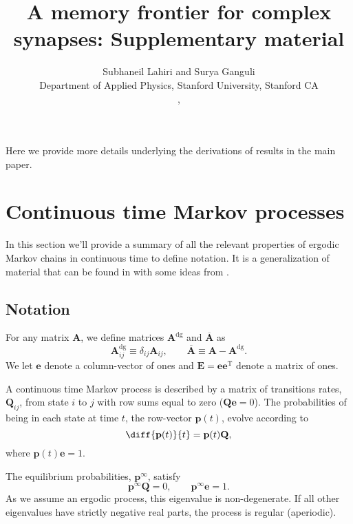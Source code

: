 \documentclass{article} %
\title{A memory frontier for complex synapses: Supplementary material}
\author{Subhaneil Lahiri and Surya Ganguli\\
Department of Applied Physics, Stanford University, Stanford CA\\
\emaillink{sulahiri@stanford.edu}, \emaillink{sulahiri@stanford.edu}
%
}
\newcommand{\dg}{^\mathrm{dg}}
\newcommand{\trans}{^\mathrm{T}}
\newcommand{\onev}{\mathbf{e}}
\newcommand{\onem}{\mathbf{E}}
\newcommand{\MM}{\mathbf{Q}}
\newcommand{\pr}{\mathbf{p}}
\newcommand{\eq}{\pr^\infty}
\begin{document}
\maketitle



Here we provide more details underlying the derivations of results in the main paper.

\section{Continuous time Markov processes}\label{sec:ContMarkov}

In this section we'll provide a summary of all the relevant properties of ergodic Markov chains in continuous time to define notation.
It is a generalization of material that can be found in \cite{kemeny1960finite} with some ideas from \cite{hunter2000survey}.


\subsection{Notation}\label{sec:not}

For any matrix $\mathbf{A}$, we define matrices $\mathbf{A}\dg$ and $\overline{\mathbf{A}}$ as
%
\begin{equation}\label{eq:dgdef}
  \mathbf{A}\dg_{ij} \equiv \delta_{ij}\mathbf{A}_{ij},
  \qquad
  \overline{\mathbf{A}} \equiv \mathbf{A}-\mathbf{A}\dg.
\end{equation}
%
We let $\onev$ denote a column-vector of ones and $\onem=\onev\onev\trans$ denote a matrix of ones.


A continuous time Markov process is described by a matrix of transitions rates, $\MM_{ij}$, from state $i$ to $j$ with row sums equal to zero ($\MM\onev=0$).
The probabilities of being in each state at time $t$, the row-vector $\mathbf{p}(t)$, evolve according to
%
\begin{equation}\label{eq:rowsum}
  \diff{\mathbf{p}(t)}{t} = \mathbf{p}(t) \MM,
\end{equation}
%
where $\mathbf{p}(t)\onev=1$.

The equilibrium probabilities, $\eq$, satisfy
%
\begin{equation}\label{eq:equilibrium}
  \eq\MM=0,
  \qquad
  \eq\onev=1.
\end{equation}
%
As we assume an ergodic process, this eigenvalue is non-degenerate.
If all other eigenvalues have strictly negative real parts, the process is regular (aperiodic).
\end{document}
